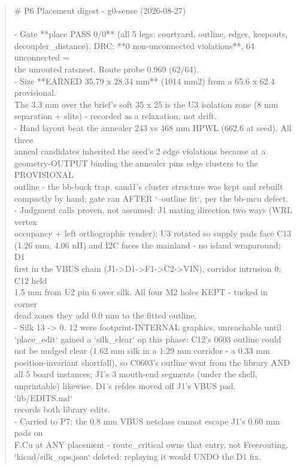 \documentclass[11pt,a4paper]{article}
\begin{document}
\begin{quote}\small\ttfamily\raggedright
\# P6 Placement digest - g0-sense (2026-08-27)\\
~\\
- Gate {*}{*}place PASS 0/0{*}{*} (all 5 legs: courtyard, outline, edges, keepouts,\\
  decoupler\_distance). DRC: {*}{*}0 non-unconnected violations{*}{*}, 64 unconnected =\\
  the unrouted ratsnest. Route probe 0.969 (62/64).\\
- Size {*}{*}EARNED 35.79 x 28.34 mm{*}{*} (1014 mm2) from a 65.6 x 62.4 provisional.\\
  The 3.3 mm over the brief's soft 35 x 25 is the U3 isolation zone (8 mm\\
  separation + slits) - recorded as a relaxation, not drift.\\
- Hand layout beat the annealer 243 vs 468 mm HPWL (662.6 at seed). All three\\
  anneal candidates inherited the seed's 2 edge violations because at a\\
  geometry-OUTPUT binding the annealer pins edge clusters to the PROVISIONAL\\
  outline - the bb-buck trap. cand1's cluster structure was kept and rebuilt\\
  compactly by hand; gate ran AFTER `--outline fit`, per the bb-mcu defect.\\
- Judgment calls proven, not assumed: J1 mating direction two ways (WRL vertex\\
  occupancy + left orthographic render); U3 rotated so supply pads face C13\\
  (1.26 mm, 4.06 nH) and I2C faces the mainland - no island wraparound; D1\\
  first in the VBUS chain (J1-\textgreater{}D1-\textgreater{}F1-\textgreater{}C2-\textgreater{}VIN), corridor intrusion 0; C12 held\\
  1.5 mm from U2 pin 6 over silk. All four M2 holes KEPT - tucked in corner\\
  dead zones they add 0.0 mm to the fitted outline.\\
- Silk 13 -\textgreater{} 0. 12 were footprint-INTERNAL graphics, unreachable until\\
  `place\_edit` gained a `silk\_clear` op this phase: C12's 0603 outline could\\
  not be nudged clear (1.62 mm silk in a 1.29 mm corridor - a 0.33 mm\\
  position-invariant shortfall), so C0603's outline went from the library AND\\
  all 5 board instances; J1's 3 mouth-end segments (under the shell,\\
  unprintable) likewise. D1's refdes moved off J1's VBUS pad. `lib/EDITS.md`\\
  records both library edits.\\
- Carried to P7: the 0.8 mm VBUS netclass cannot escape J1's 0.60 mm pads on\\
  F.Cu at ANY placement - route\_critical owns that entry, not Freerouting.\\
  `kicad/silk\_ops.json` deleted: replaying it would UNDO the D1 fix.
\end{quote}
\end{document}
